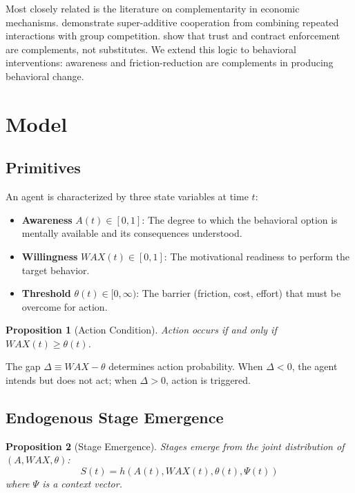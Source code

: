 \documentclass[12pt]{article}
\newtheorem{proposition}{Proposition}
\begin{document}
Most closely related is the literature on complementarity in economic mechanisms. \citet{efferson2024superadditive} demonstrate super-additive cooperation from combining repeated interactions with group competition. \citet{bartling2025complementarity} show that trust and contract enforcement are complements, not substitutes. We extend this logic to behavioral interventions: awareness and friction-reduction are complements in producing behavioral change.



\section{Model}

\subsection{Primitives}

An agent is characterized by three state variables at time $t$:
\begin{itemize}
    \item \textbf{Awareness} $A(t) \in [0,1]$: The degree to which the behavioral option is mentally available and its consequences understood.
    \item \textbf{Willingness} $WAX(t) \in [0,1]$: The motivational readiness to perform the target behavior.
    \item \textbf{Threshold} $\theta(t) \in [0,\infty)$: The barrier (friction, cost, effort) that must be overcome for action.
\end{itemize}

\begin{proposition}[Action Condition]
Action occurs if and only if $WAX(t) \geq \theta(t)$.
\end{proposition}

The gap $\Delta \equiv WAX - \theta$ determines action probability. When $\Delta < 0$, the agent intends but does not act; when $\Delta > 0$, action is triggered.

\subsection{Endogenous Stage Emergence}

\begin{proposition}[Stage Emergence]
Stages emerge from the joint distribution of $(A, WAX, \theta)$:
\begin{equation}
S(t) = h(A(t), WAX(t), \theta(t), \Psi(t))
\end{equation}
where $\Psi$ is a context vector.
\end{proposition}
\end{document}
